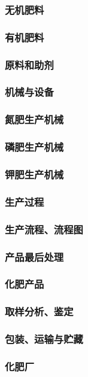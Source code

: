 \documentclass[UTF8]{../../ApplicationUniverse}
\begin{document}
        \subsubsection{无机肥料}
        \subsubsection{有机肥料}
    \subsubsection{原料和助剂}
    \subsubsection{机械与设备}
        \subsubsection{氮肥生产机械}
        \subsubsection{磷肥生产机械}
        \subsubsection{钾肥生产机械}
    \subsubsection{生产过程}
        \subsubsection{生产流程、流程图}
        \subsubsection{产品最后处理}
    \subsubsection{化肥产品}
        \subsubsection{取样分析、鉴定}
        \subsubsection{包装、运输与贮藏}
    \subsubsection{化肥厂}
\end{document}
